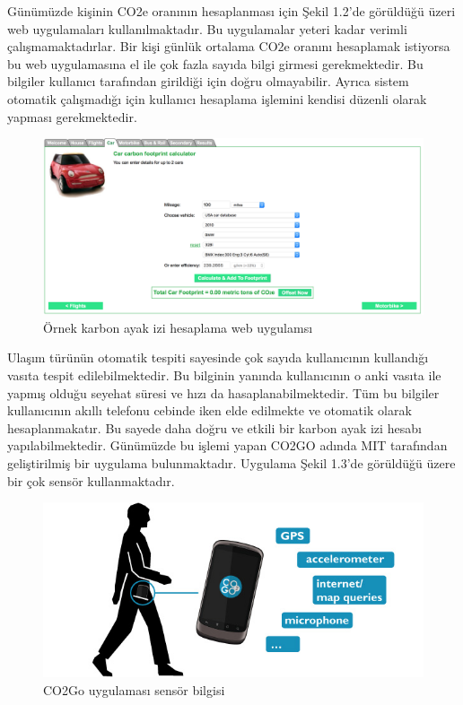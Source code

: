 Günümüzde kişinin CO2e oranının hesaplanması için Şekil 1.2'de görüldüğü üzeri web uygulamaları kullanılmaktadır. Bu uygulamalar yeteri kadar verimli çalışmamaktadırlar. Bir kişi günlük ortalama CO2e oranını hesaplamak istiyorsa bu web uygulamasına el ile çok fazla sayıda bilgi girmesi gerekmektedir. Bu bilgiler kullanıcı tarafından girildiği için doğru olmayabilir. Ayrıca sistem otomatik çalışmadığı için kullanıcı hesaplama işlemini kendisi düzenli olarak yapması gerekmektedir. 

\begin{figure}[!h]
\centering
\includegraphics[scale=0.4]{projectChapters/images/CO2_calculator.png}
\caption{Örnek karbon ayak izi hesaplama web uygulamsı}
\end{figure}

Ulaşım türünün otomatik tespiti sayesinde çok sayıda kullanıcının kullandığı vasıta tespit edilebilmektedir. Bu bilginin yanında kullanıcının o anki vasıta ile yapmış olduğu seyehat süresi ve hızı da hasaplanabilmektedir. Tüm bu bilgiler kullanıcının akıllı telefonu cebinde iken elde edilmekte ve otomatik olarak hesaplanmakatır. Bu sayede daha doğru ve etkili bir karbon ayak izi hesabı yapılabilmektedir. Günümüzde bu işlemi yapan CO2GO adında MIT tarafından geliştirilmiş bir uygulama bulunmaktadır. Uygulama Şekil 1.3'de görüldüğü üzere bir çok sensör kullanmaktadır. 

\begin{figure}[!h]
\centering
\includegraphics[scale=0.4]{projectChapters/images/sensors.jpg}
\caption{CO2Go uygulaması sensör bilgisi}
\end{figure}

